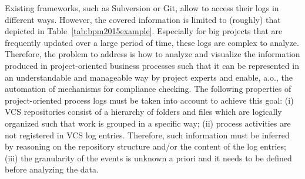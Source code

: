 
Existing frameworks, such as Subversion or Git, allow to access their logs in different ways. However, the covered information is limited to (roughly) that depicted in Table~\ref{tab:bpm2015example}. Especially for big projects that are frequently updated over a large period of time, these logs are complex to analyze.
Therefore, the problem to address is how to analyze and visualize the information produced in project-oriented business processes such that it can be represented in an understandable and manageable way by project experts and
enable, a.o., the automation of mechanisms for compliance checking.
The following properties of project-oriented process logs must be taken into account to achieve this goal: (i) VCS repositories consist of a hierarchy of folders and files which are logically organized such that work is grouped in a specific way; (ii) process activities are not registered in VCS log entries. Therefore, such information must be inferred by reasoning on the repository structure and/or the content of the log entries; (iii) the granularity of the events is unknown a priori and it needs to be defined before analyzing the data.




